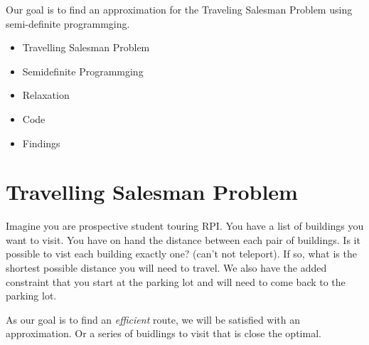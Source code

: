 \documentclass{article}
\begin{document}
Our goal is to find an approximation for the Traveling Salesman Problem using semi-definite programmging.

\begin{itemize}
\item Travelling Salesman Problem
\item Semidefinite Programmging
\item Relaxation
\item Code 
\item Findings
\end{itemize}

\section{Travelling Salesman Problem}
Imagine you are prospective student touring RPI. You have a list of buildings you want to visit.
You have on hand the distance between each pair of buildings. Is it possible to vist each building exactly one?
(can't not teleport). If so, what is the shortest possible distance you will need to travel. We also 
have the added constraint that you start at the parking lot and will need to come back to the parking lot.



As our goal is to find an \emph{efficient} route, we will be satisfied with an approximation. 
Or a series of buidlings to visit that is close the optimal.
\end{document}
